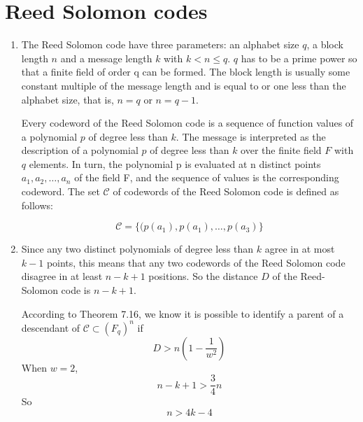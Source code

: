 \documentclass{article}
\begin{document}
\section{Reed Solomon codes}
\begin{enumerate}
\item
The Reed Solomon code have three parameters: an alphabet size $q$, a block length $n$ and a message length $k$ with $k<n\leqslant q$. $q$ has to be a prime power so that a finite field of order q can be formed. The block length is usually some constant multiple of the message length and is equal to or one less than the alphabet size, that is, $n=q$ or $n=q-1$.

Every codeword of the Reed Solomon code is a sequence of function values of a polynomial $p$ of degree less than $k$. The message is interpreted as the description of a polynomial $p$ of degree less than $k$ over the finite field $F$ with $q$ elements. In turn, the polynomial p is evaluated at n distinct points $a_1,a_2,\dots,a_n$ of the field F, and the sequence of values is the corresponding codeword. The set $\mathcal{C}$ of codewords of the Reed Solomon code is defined as follows:

$$\mathcal{C}=\{(p(a_1),p(a_1),\dots,p(a_3)\}$$

\item
Since any two distinct polynomials of degree less than $k$ agree in at most $k-1$ points, this means that any two codewords of the Reed Solomon code disagree in at least $n-k+1$ positions. So the distance $D$ of the Reed-Solomon code is $n-k+1$.

According to Theorem 7.16, we know it is possible to identify a parent of a descendant of $\mathcal{C}\subset(F_q)^n$ if
$$D>n(1-\frac{1}{w^2})$$
When $w=2$,
$$n-k+1>\frac{3}{4}n$$
So
$$n>4k-4$$
\end{enumerate}
\end{document}

